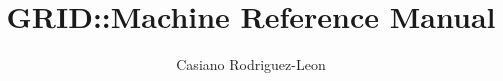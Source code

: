 \documentclass{article}
\title{GRID::Machine Reference Manual}
\author{Casiano Rodriguez-Leon}
\begin{document}
\maketitle

\tableofcontents 

\pagebreak
\end{document}
